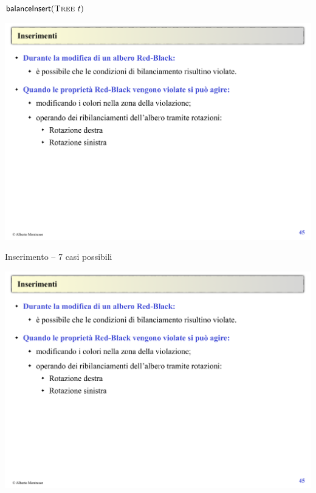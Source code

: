 \begin{frame}{$\textsf{balanceInsert}(\Tree\ t)$}

\includegraphics[width=1.0\textwidth,page=9]{redblack2.pdf}

\end{frame}

\begin{frame}{Inserimento -- 7 casi possibili}

\includegraphics[width=1.0\textwidth,page=10]{redblack2.pdf}

\end{frame}

